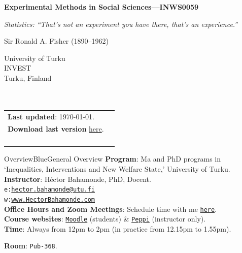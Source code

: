 \documentclass[letterpaper]{article}\usepackage[]{graphicx}\usepackage[svgnames]{xcolor}
\def\name{Experimental Methods in Social Sciences---INWS0059}
\begin{document}

\centerline{\huge \bf \name}

\epigraph{\emph{Statistics: ``That's not an experiment you have there, that’s an experience.''}}{Sir Ronald A. Fisher (1890–1962)}


\vspace{0.25in}

\begin{minipage}{0.45\linewidth}
 University of Turku \\
  INVEST \\
  Turku, Finland\\
  \\
  \\

\end{minipage}
\hfill\begin{minipage}{0.45\linewidth}
  \begin{tabular}{ll}
{\bf Last updated}: \today. \\
 {\bf Download last version} \href{https://github.com/hbahamonde/Exp_Soc_Science/raw/main/Bahamonde_Exp_Soc_Sci.pdf}{here}.%
    \\
    \\
    \\
    \\
    \\
  \end{tabular}
\end{minipage}

\begin{syllabusbox}{OverviewBlue}{General Overview}
{\bf Program}: Ma and PhD programs in `Inequalities, Interventions and New Welfare State,' University of Turku.\\
{\bf Instructor}: H\'ector Bahamonde, PhD, Docent.\\
\texttt{e:}\href{mailto:hector.bahamonde@utu.fi}{\texttt{hector.bahamonde@utu.fi}}\\
\texttt{w:}\href{http://www.hectorbahamonde.com}{\texttt{www.HectorBahamonde.com}}\\
{\bf Office Hours and Zoom Meetings}: Schedule time with me \href{https://calendly.com/bahamonde}{\texttt{here}}.\\
{\bf Course websites}: \href{https://moodle.utu.fi/course/view.php?id=33451}{\texttt{Moodle}} (students) \& \href{https://planner.peppi.utu.fi/group/suunnittelijan-tyopoyta}{\texttt{Peppi}} (instructor only).\\
{\bf Time}: Always from 12pm to 2pm (in practice from 12.15pm to 1.55pm).




{\bf Room}: \texttt{Pub-368}.
\end{syllabusbox}
\end{document}
